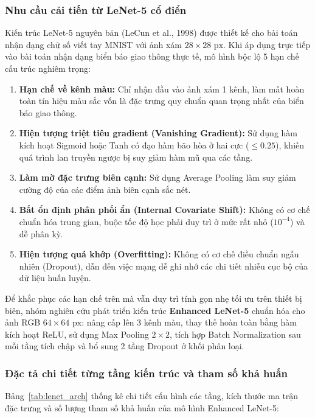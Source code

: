 \subsubsection{Nhu cầu cải tiến từ LeNet-5 cổ điển}
\label{subsubsec:lenet_cai_tien}

Kiến trúc LeNet-5 nguyên bản (LeCun et al., 1998) được thiết kế cho bài toán nhận dạng chữ số viết tay MNIST với ảnh xám $28 \times 28\text{ px}$. Khi áp dụng trực tiếp vào bài toán nhận dạng biển báo giao thông thực tế, mô hình bộc lộ 5 hạn chế cấu trúc nghiêm trọng:

\begin{enumerate}
    \item \textbf{Hạn chế về kênh màu:} Chỉ nhận đầu vào ảnh xám 1 kênh, làm mất hoàn toàn tín hiệu màu sắc vốn là đặc trưng quy chuẩn quan trọng nhất của biển báo giao thông.
    \item \textbf{Hiện tượng triệt tiêu gradient (Vanishing Gradient):} Sử dụng hàm kích hoạt Sigmoid hoặc Tanh có đạo hàm bão hòa ở hai cực ($\le 0.25$), khiến quá trình lan truyền ngược bị suy giảm hàm mũ qua các tầng.
    \item \textbf{Làm mờ đặc trưng biên cạnh:} Sử dụng Average Pooling làm suy giảm cường độ của các điểm ảnh biên cạnh sắc nét.
    \item \textbf{Bất ổn định phân phối ẩn (Internal Covariate Shift):} Không có cơ chế chuẩn hóa trung gian, buộc tốc độ học phải duy trì ở mức rất nhỏ ($10^{-4}$) và dễ phân kỳ.
    \item \textbf{Hiện tượng quá khớp (Overfitting):} Không có cơ chế điều chuẩn ngẫu nhiên (Dropout), dẫn đến việc mạng dễ ghi nhớ các chi tiết nhiễu cục bộ của dữ liệu huấn luyện.
\end{enumerate}

Để khắc phục các hạn chế trên mà vẫn duy trì tính gọn nhẹ tối ưu trên thiết bị biên, nhóm nghiên cứu phát triển kiến trúc \textbf{Enhanced LeNet-5} chuẩn hóa cho ảnh RGB $64 \times 64\text{ px}$: nâng cấp lên 3 kênh màu, thay thế hoàn toàn bằng hàm kích hoạt ReLU, sử dụng Max Pooling $2 \times 2$, tích hợp Batch Normalization sau mỗi tầng tích chập và bổ sung 2 tầng Dropout ở khối phân loại.

\subsubsection{Đặc tả chi tiết từng tầng kiến trúc và tham số khả huấn}
\label{subsubsec:lenet_kien_truc}

Bảng~\ref{tab:lenet_arch} thống kê chi tiết cấu hình các tầng, kích thước ma trận đặc trưng và số lượng tham số khả huấn của mô hình Enhanced LeNet-5:

